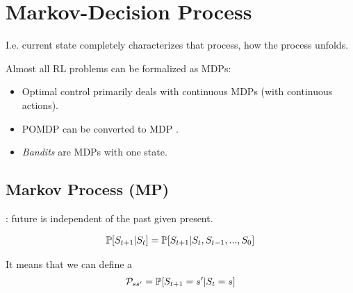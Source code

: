 \section{Markov-Decision Process}


I.e. current state completely characterizes that process, how the process unfolds.

Almost all RL problems can be formalized as MDPs:
\begin{itemize}
	\item Optimal control primarily deals with continuous MDPs (with continuous actions).
	\item POMDP can be converted to MDP	.
	\item \textit{Bandits} are MDPs with one state.
\end{itemize}



\subsection{Markov Process (MP)}

: future is independent of the past given present.

\begin{align}
	\mathbb{P}[S_{t+1} | S_t] = 	\mathbb{P}[S_{t+1} | S_t, S_{t-1}, ..., S_{0}]
\end{align}

It means that we can define a 
\begin{align}
	\mathcal{P}_{ss'} = \mathbb{P}[S_{t+1} = s' | S_t = s]
\end{align}



